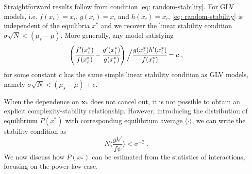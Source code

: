Straightforward results follow from condition \eqref{eq: random-stability}.
For GLV models, i.e. $f(x_i)=x_i$, $g(x_i)=x_i$ and $h(x_i)=x_i$, \eqref{eq: random-stability} is independent of the equilibria $x^*$ and we recover the linear stability condition
$\sigma\sqrt{N} < (\mu_s-\mu)$.
More generally, any model satisfying
\begin{equation}\label{eq: equiv class glv}
    \left(\cfrac{f'(x_i^*)}{f(x_i^*)} -
        \cfrac{g'(x_i^*)}{g(x_i^*)}\right)\Bigl /
        \cfrac{g(x_i^*)h'(x_i^*)}{f(x_i^*)} = c \ ,
\end{equation}
for some constant $c$ has the same simple linear stability condition as GLV models, namely $\sigma\sqrt{N} < (\mu_s-\mu) +c$.

When the dependence on $\mathbf{x}_*$ does not cancel out, it is not possible to obtain an explicit complexity-stability relationship. 
However, introducing the distribution of equilibrium $P(x^*)$ with corresponding equilibrium average $\langle\cdot\rangle$, we can write the stability condition as
\begin{equation}\label{eq: random-stability int}
    N\Big\langle\frac{gh'}{f\psi}\Big\rangle < \sigma^{-2} \ .
\end{equation}
We now discuss how $P(x_*)$ can be estimated from the statistics of interactions, focusing on the power-law case.
